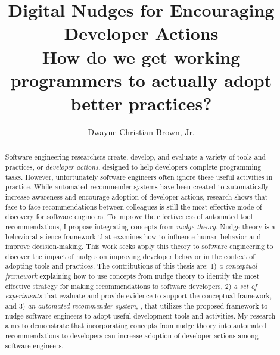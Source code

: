 \documentclass[runningheads]{llncs}
\begin{document}
%
\title{Digital Nudges for Encouraging \\Developer Actions
    \\\large How do we get working programmers to actually adopt better practices?}
%
%
\author{Dwayne Christian Brown, Jr.}
%
%
%
\maketitle              %
%
\begin{abstract}
Software engineering researchers create, develop, and evaluate a variety of tools and practices, or \textit{developer actions}, designed to help developers complete programming tasks. However, unfortunately software engineers often ignore these useful activities in practice. While automated recommender systems have been created to automatically increase awareness and encourage adoption of developer actions, research shows that face-to-face recommendations between colleagues is still the most effective mode of discovery for software engineers. To improve the effectiveness of automated tool recommendations, I propose integrating concepts from \textit{nudge theory}. Nudge theory is a behavioral science framework that examines how to influence human behavior and improve decision-making. This work seeks apply this theory to software engineering to discover the impact of nudges on improving developer behavior in the context of adopting tools and practices. The contributions of this thesis are: 1) \textit{a conceptual framework} explaining how to use concepts from nudge theory to identify the most effective strategy for making recommendations to software developers, 2) \textit{a set of experiments} that evaluate and provide evidence to support the conceptual framework, and 3) \textit{an automated recommender system}, \TOOL, that utilizes the proposed framework to nudge software engineers to adopt useful development tools and activities. My research aims to demonstrate that incorporating concepts from nudge theory into automated recommendations to developers can increase adoption of developer actions among software engineers.
\end{abstract}
\end{document}
